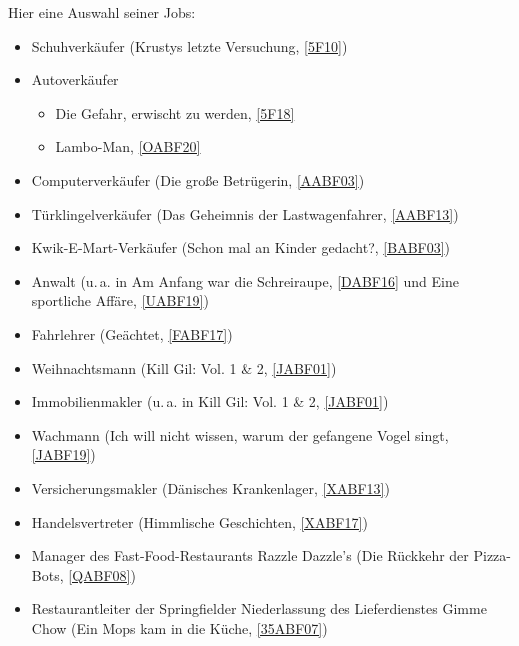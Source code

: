 {Hier eine Auswahl seiner Jobs:
\begin{itemize}
 	\item Schuhverkäufer (\glqq Krustys letzte Versuchung\grqq , \ref{5F10})
	\item Autoverkäufer 
	\begin{itemize}
	  \item \glqq Die Gefahr, erwischt zu werden\grqq, \ref{5F18}
	  \item \glqq Lambo-Man\grqq, \ref{OABF20}
	\end{itemize}
	\item Computerverkäufer (\glqq Die große Betrügerin\grqq , \ref{AABF03})
	\item Türklingelverkäufer (\glqq Das Geheimnis der Lastwagenfahrer\grqq , \ref{AABF13})
	\item Kwik-E-Mart-Verkäufer (\glqq Schon mal an Kinder gedacht?\grqq , \ref{BABF03})
	\item Anwalt (u.\,a. in \glqq Am Anfang war die Schreiraupe\grqq , \ref{DABF16} und \glqq Eine sportliche Affäre\grqq, \ref{UABF19})
	\item Fahrlehrer (\glqq Geächtet\grqq , \ref{FABF17})
	\item Weihnachtsmann (\glqq Kill Gil: Vol. 1 \& 2\grqq, \ref{JABF01})
	\item Immobilienmakler (u.\,a. in \glqq Kill Gil: Vol. 1 \& 2\grqq, \ref{JABF01})
	\item Wachmann (\glqq Ich will nicht wissen, warum der gefangene Vogel singt\grqq , \ref{JABF19})
	\item Versicherungsmakler (\glqq Dänisches Krankenlager\grqq, \ref{XABF13})
	\item Handelsvertreter (\glqq Himmlische Geschichten\grqq, \ref{XABF17})
	\item Manager des Fast-Food-Restaurants Razzle Dazzle's (\glqq Die Rückkehr der Pizza-Bots\grqq, \ref{QABF08})
	\item Restaurantleiter der Springfielder Niederlassung des Lieferdienstes Gimme Chow (\glqq Ein Mops kam in die Küche\grqq, \ref{35ABF07})
\end{itemize}


}
